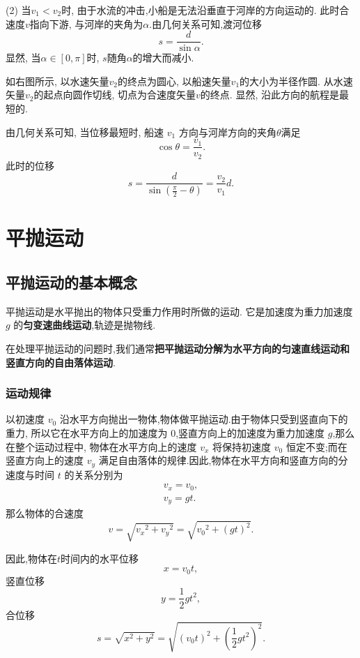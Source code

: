 \documentclass[11pt,a4paper]{ctexart}
\begin{document}
(2) 当$v_1 < v_2$时, 由于水流的冲击,小船是无法沿垂直于河岸的方向运动的. 此时合速度$v$指向下游,
与河岸的夹角为$\alpha$.由几何关系可知,渡河位移$$s = \frac{d}{\sin {\alpha}}.$$
显然, 当$\alpha \in [0,\pi]$时, $s$随角$\alpha$的增大而减小.

如右图所示, 以水速矢量$v_2$的终点为圆心, 以船速矢量$v_1$的大小为半径作圆. 从水速矢量$v_2$的起点向圆作切线,
切点为合速度矢量$v$的终点. 显然, 沿此方向的航程是最短的.

由几何关系可知, 当位移最短时, 船速 $v_1$ 方向与河岸方向的夹角$\theta$满足 $$\cos{\theta} = \frac{v_1}{v_2}.$$
此时的位移 $$s = \frac{d}{\sin \left (\displaystyle\frac{\pi}{2}-\theta \right )} = \frac{v_2}{v_1} d.$$

\section{平抛运动}
\subsection{平抛运动的基本概念}

平抛运动是水平抛出的物体只受重力作用时所做的运动.
它是加速度为重力加速度 $g$ 的\textbf{匀变速曲线运动},轨迹是抛物线.

在处理平抛运动的问题时,我们通常\textbf{把平抛运动分解为水平方向的匀速直线运动和竖直方向的自由落体运动}.

\subsubsection{运动规律}

以初速度 $v_0$ 沿水平方向抛出一物体,物体做平抛运动.由于物体只受到竖直向下的重力,
所以它在水平方向上的加速度为 0,竖直方向上的加速度为重力加速度 $g$,那么在整个运动过程中,
物体在水平方向上的速度 $ v_{x}$ 将保持初速度 $v_0$ 恒定不变;而在竖直方向上的速度 $v_y$
满足自由落体的规律.因此,物体在水平方向和竖直方向的分速度与时间 $t$ 的关系分别为
\setlength{\abovedisplayskip}{3pt}
\setlength{\belowdisplayskip}{3pt}
\begin{align*}
	v_x=v_0, \\
	v_y=gt.
\end{align*}
那么物体的合速度
\begin{equation}
	\label{合速度}
	v=\sqrt{{v_x}^2+{v_y}^2}=\sqrt{{v_0}^2+\left(gt\right)^2}.
\end{equation}

因此,物体在$t$时间内的水平位移
\begin{equation}
	\label{水平位移}
	x=v_0t,
\end{equation}
竖直位移
\begin{equation}
	\label{竖直位移}
	y=\frac12gt^2,
\end{equation}
合位移 $$s=\sqrt{x^2+y^2}=\sqrt{\left(v_0t\right)^2+\left(\frac{1}{2}gt^2\right)^2}.$$
\end{document}
